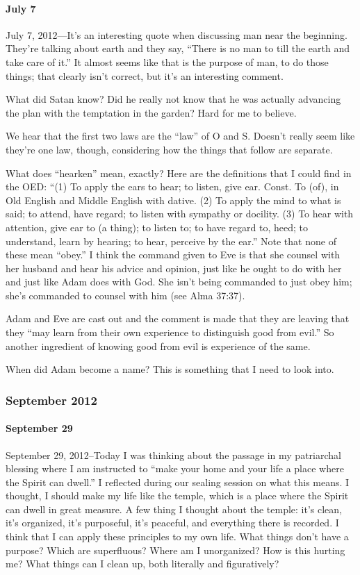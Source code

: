 			\paragraph*{July 7} July 7, 2012---It's an interesting quote when discussing man near the beginning. They're talking about earth and they say, ``There is no man to till the earth and take care of it.'' It almost seems like that is the purpose of man, to do those things; that clearly isn't correct, but it's an interesting comment.

			What did Satan know? Did he really not know that he was actually advancing the plan with the temptation in the garden? Hard for me to believe.

			We hear that the first two laws are the ``law'' of O and S. Doesn't really seem like they're one law, though, considering how the things that follow are separate.

			What does ``hearken'' mean, exactly? Here are the definitions that I could find in the OED: ``(1) To apply the ears to hear; to listen, give ear. Const. To (of), in Old English and Middle English with dative. (2) To apply the mind to what is said; to attend, have regard; to listen with sympathy or docility. (3) To hear with attention, give ear to (a thing); to listen to; to have regard to, heed; to understand, learn by hearing; to hear, perceive by the ear.'' Note that none of these mean ``obey.'' I think the command given to Eve is that she counsel with her husband and hear his advice and opinion, just like he ought to do with her and just like Adam does with God. She isn't being commanded to just obey him; she's commanded to counsel with him (see Alma 37:37).

			Adam and Eve are cast out and the comment is made that they are leaving that they ``may learn from their own experience to distinguish good from evil.'' So another ingredient of knowing good from evil is experience of the same.

			When did Adam become a name? This is something that I need to look into.

		\subsubsection*{September 2012}

			\paragraph*{September 29} September 29, 2012--Today I was thinking about the passage in my patriarchal blessing where I am instructed to ``make your home and your life a place where the Spirit can dwell.'' I reflected during our sealing session on what this means. I thought, I should make my life like the temple, which is a place where the Spirit can dwell in great measure. A few thing I thought about the temple: it's clean, it's organized, it's purposeful, it's peaceful, and everything there is recorded. I think that I can apply these principles to my own life. What things don't have a purpose? Which are superfluous? Where am I unorganized? How is this hurting me? What things can I clean up, both literally and figuratively?

